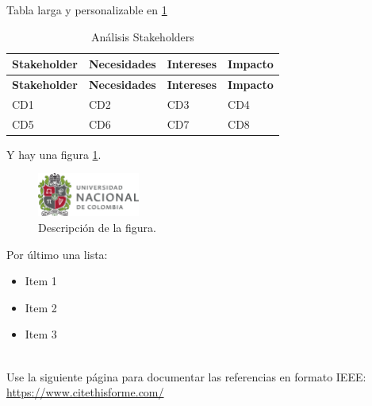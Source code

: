 \documentclass{article}
\begin{document}
Tabla larga y personalizable en \ref{tab:anaTab}

\renewcommand{\tablename}{Tabla}
\begin{longtable}{|p{3.5cm}|p{3cm}|p{3cm}|p{5cm}|} %
  \caption{Análisis Stakeholders\label{tab:anaTab}} \\
  \hline
  \textbf{Stakeholder} & \textbf{Necesidades} & \textbf{Intereses} & \textbf{Impacto} \\
  \hline
  \endfirsthead %
  \hline
  \textbf{Stakeholder} & \textbf{Necesidades} & \textbf{Intereses} & \textbf{Impacto} \\
  \hline
  \endhead %
  CD1 & CD2 & CD3 & CD4 \\
  \hline
  CD5 & CD6 & CD7 & CD8 \\
  \hline
\end{longtable}


Y hay una figura \ref{fig:ejemplo}.\\

\renewcommand{\figurename}{Figura}
\begin{figure}[htbp]
  \centering
  \includegraphics[width=0.3\textwidth]{logo_universidad.png}
  \caption{Descripción de la figura.}
  \label{fig:ejemplo}
\end{figure}

Por último una lista:

\begin{itemize}
  \item Item 1
  \item Item 2
  \item Item 3\\\\
\end{itemize}


Use la siguiente página para documentar las referencias en formato IEEE: 
\href{https://www.citethisforme.com/}{https://www.citethisforme.com/}
\end{document}
